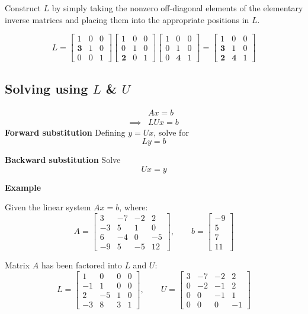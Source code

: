 \documentclass[../linear-algebra.tex]{subfiles}
\begin{document}
\noindent Construct $L$ by simply taking the nonzero off-diagonal elements of the elementary inverse matrices and placing them into the appropriate positions in $L$. 

\[
L = \begin{bmatrix} 1 & 0 & 0 \\ \mathbf{3} & 1 & 0 \\ 0 & 0 & 1 \end{bmatrix} \begin{bmatrix} 1 & 0 & 0 \\ 0 & 1 & 0 \\ \mathbf{2} & 0 & 1 \end{bmatrix} \begin{bmatrix} 1 & 0 & 0 \\ 0 & 1 & 0 \\ 0 & \mathbf{4} & 1 \end{bmatrix} = \begin{bmatrix} 1 & 0 & 0 \\ \mathbf{3} & 1 & 0 \\ \mathbf{2} & \mathbf{4} & 1 \end{bmatrix}
\]

\subsection{Solving using $L$ \& $U$}
\begin{align*}
           & Ax = b \\
  \implies & LUx = b
\end{align*}
\noindent\textbf{Forward substitution}
Defining $y= Ux$, solve for
\[Ly=b\]

\noindent\textbf{Backward substitution}
Solve
\[Ux=y\]

\noindent\textbf{Example}

\noindent Given the linear system $Ax = b$, where:
\[
A = \begin{bmatrix} 3 & -7 & -2 & 2 \\ -3 & 5 & 1 & 0 \\ 6 & -4 & 0 & -5 \\ -9 & 5 & -5 & 12 \end{bmatrix}, \qquad
b = \begin{bmatrix} -9 \\ 5 \\ 7 \\ 11 \end{bmatrix}
\]

\noindent Matrix $A$ has been factored into $L$ and $U$:
\[
L = \begin{bmatrix} 1 & 0 & 0 & 0 \\ -1 & 1 & 0 & 0 \\ 2 & -5 & 1 & 0 \\ -3 & 8 & 3 & 1 \end{bmatrix}, \qquad
U = \begin{bmatrix} 3 & -7 & -2 & 2 \\ 0 & -2 & -1 & 2 \\ 0 & 0 & -1 & 1 \\ 0 & 0 & 0 & -1 \end{bmatrix}
\]
\end{document}
